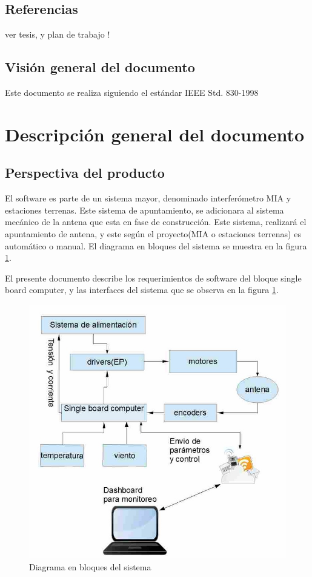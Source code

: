\documentclass[12pt,a4paper, twosite]{article}
\begin{document}
	
	\subsection{Referencias}
	\label{sec:org62711e0}
	ver tesis, y plan de trabajo ! 
	
	\subsection{Visión general del documento}
	\label{sec:orgdaca22c}
	
	Este documento se realiza siguiendo el estándar IEEE Std. 830-1998
	
	
	\section{Descripción general del documento}
	\label{sec:orgc1c4017}
	
	\subsection{Perspectiva del producto}
	\label{sec:org24980a8}
	El software es parte de un sistema mayor, denominado interferómetro MIA y estaciones terrenas. Este sistema de apuntamiento, se adicionara al sistema mecánico de la antena que esta en fase de construcción. Este sistema, realizará el apuntamiento de antena, y este según el proyecto(MIA o estaciones terrenas) es automático o manual. El diagrama en bloques del sistema se muestra en la figura \ref{fig:diagramaBloques}. 
	
	 El presente documento describe los requerimientos de software del bloque single board computer, y las interfaces del sistema que se observa en la figura  \ref{fig:diagramaBloques}. 
	\begin{figure}[h!]
		\centering
		\includegraphics[scale=0.5]{bloquesInt.jpg}
		\caption{Diagrama en bloques del sistema}
		\label{fig:diagramaBloques}
	\end{figure}
\end{document}
